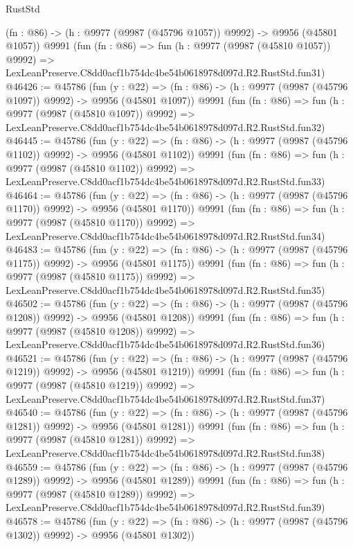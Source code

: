 \begin{lexlean}{RustStd}
\begin{coremodule}
    (fn : @86) -> (h : @9977 (@9987 (@45796 @1057)) @9992) -> @9956 (@45801 @1057))
    @9991
    (fun (fn : @86) =>
    fun (h : @9977 (@9987 (@45810 @1057)) @9992) =>
    LexLeanPreserve.C8dd0acf1b754dc4be54b0618978d097d.R2.RustStd.fun31)
@46426 := @45786
    (fun (y : @22) =>
    (fn : @86) -> (h : @9977 (@9987 (@45796 @1097)) @9992) -> @9956 (@45801 @1097))
    @9991
    (fun (fn : @86) =>
    fun (h : @9977 (@9987 (@45810 @1097)) @9992) =>
    LexLeanPreserve.C8dd0acf1b754dc4be54b0618978d097d.R2.RustStd.fun32)
@46445 := @45786
    (fun (y : @22) =>
    (fn : @86) -> (h : @9977 (@9987 (@45796 @1102)) @9992) -> @9956 (@45801 @1102))
    @9991
    (fun (fn : @86) =>
    fun (h : @9977 (@9987 (@45810 @1102)) @9992) =>
    LexLeanPreserve.C8dd0acf1b754dc4be54b0618978d097d.R2.RustStd.fun33)
@46464 := @45786
    (fun (y : @22) =>
    (fn : @86) -> (h : @9977 (@9987 (@45796 @1170)) @9992) -> @9956 (@45801 @1170))
    @9991
    (fun (fn : @86) =>
    fun (h : @9977 (@9987 (@45810 @1170)) @9992) =>
    LexLeanPreserve.C8dd0acf1b754dc4be54b0618978d097d.R2.RustStd.fun34)
@46483 := @45786
    (fun (y : @22) =>
    (fn : @86) -> (h : @9977 (@9987 (@45796 @1175)) @9992) -> @9956 (@45801 @1175))
    @9991
    (fun (fn : @86) =>
    fun (h : @9977 (@9987 (@45810 @1175)) @9992) =>
    LexLeanPreserve.C8dd0acf1b754dc4be54b0618978d097d.R2.RustStd.fun35)
@46502 := @45786
    (fun (y : @22) =>
    (fn : @86) -> (h : @9977 (@9987 (@45796 @1208)) @9992) -> @9956 (@45801 @1208))
    @9991
    (fun (fn : @86) =>
    fun (h : @9977 (@9987 (@45810 @1208)) @9992) =>
    LexLeanPreserve.C8dd0acf1b754dc4be54b0618978d097d.R2.RustStd.fun36)
@46521 := @45786
    (fun (y : @22) =>
    (fn : @86) -> (h : @9977 (@9987 (@45796 @1219)) @9992) -> @9956 (@45801 @1219))
    @9991
    (fun (fn : @86) =>
    fun (h : @9977 (@9987 (@45810 @1219)) @9992) =>
    LexLeanPreserve.C8dd0acf1b754dc4be54b0618978d097d.R2.RustStd.fun37)
@46540 := @45786
    (fun (y : @22) =>
    (fn : @86) -> (h : @9977 (@9987 (@45796 @1281)) @9992) -> @9956 (@45801 @1281))
    @9991
    (fun (fn : @86) =>
    fun (h : @9977 (@9987 (@45810 @1281)) @9992) =>
    LexLeanPreserve.C8dd0acf1b754dc4be54b0618978d097d.R2.RustStd.fun38)
@46559 := @45786
    (fun (y : @22) =>
    (fn : @86) -> (h : @9977 (@9987 (@45796 @1289)) @9992) -> @9956 (@45801 @1289))
    @9991
    (fun (fn : @86) =>
    fun (h : @9977 (@9987 (@45810 @1289)) @9992) =>
    LexLeanPreserve.C8dd0acf1b754dc4be54b0618978d097d.R2.RustStd.fun39)
@46578 := @45786
    (fun (y : @22) =>
    (fn : @86) -> (h : @9977 (@9987 (@45796 @1302)) @9992) -> @9956 (@45801 @1302))

\end{coremodule}
\end{lexlean}
